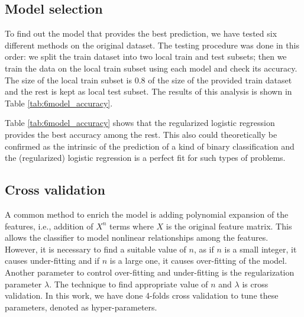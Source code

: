 \documentclass[8pt,conference,compsocconf]{IEEEtran}
\begin{document}
\subsection{Model selection}
To find out the model that provides the best prediction, we have tested six different methods on the original dataset. The testing procedure was done in this order: we split the train dataset into two local train and test subsets; then we train the data on the local train subset using each model and check its accuracy. The size of the local train subset is $0.8$ of the size of the provided train dataset and the rest is kept as local test subset. The results of this analysis is shown in Table \ref{tab:6model_accuracy}.

Table \ref{tab:6model_accuracy} shows that the regularized logistic  regression provides the best accuracy among the rest. This also could theoretically be confirmed as the intrinsic of the prediction of a kind of binary classification and the (regularized) logistic regression is a perfect fit for such types of problems.




\subsection{Cross validation}
A common method to enrich the model is adding polynomial expansion of the features, i.e., addition of ${X^n}$ terms where $X$ is the original feature matrix. This allows the classifier to model nonlinear relationships among the features. However, it is necessary to find a suitable value of $n$, as if $n$ is a small integer, it causes under-fitting and if $n$ is a large one, it causes over-fitting of the model. Another parameter to control over-fitting and under-fitting is the regularization parameter $\lambda$. The technique to find appropriate value of $n$ and $\lambda$ is cross validation. In this work, we have done 4-folds cross validation to tune these parameters, denoted as hyper-parameters. 
\end{document}
